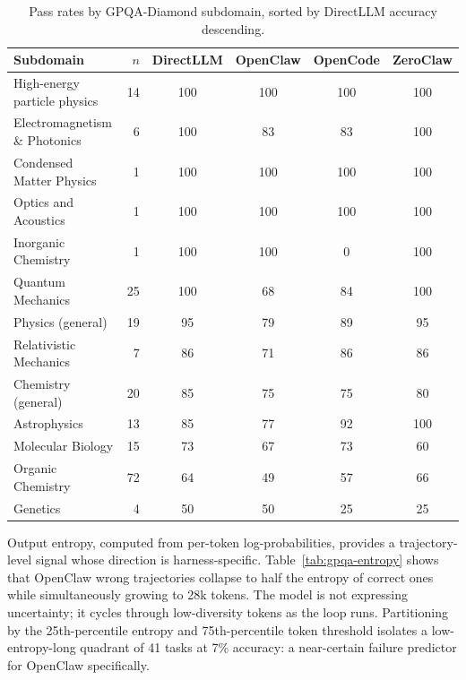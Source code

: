 \begin{table}[t]
\centering
\small
\caption{%
  Pass rates by GPQA-Diamond subdomain, sorted by DirectLLM accuracy descending.
}
\label{tab:gpqa-subdomain}
\setlength{\tabcolsep}{4pt}
\begin{tabular}{lrcccc}
\toprule
Subdomain & $n$ & DirectLLM & OpenClaw & OpenCode & ZeroClaw \\
\midrule
High-energy particle physics  & 14 & 100 & 100 & 100 & 100 \\
Electromagnetism \& Photonics &  6 & 100 &  83 &  83 & 100 \\
Condensed Matter Physics      &  1 & 100 & 100 & 100 & 100 \\
Optics and Acoustics          &  1 & 100 & 100 & 100 & 100 \\
Inorganic Chemistry           &  1 & 100 & 100 &   0 & 100 \\
Quantum Mechanics             & 25 & 100 &  68 &  84 & 100 \\
Physics (general)             & 19 &  95 &  79 &  89 &  95 \\
Relativistic Mechanics        &  7 &  86 &  71 &  86 &  86 \\
Chemistry (general)           & 20 &  85 &  75 &  75 &  80 \\
Astrophysics                  & 13 &  85 &  77 &  92 & 100 \\
Molecular Biology             & 15 &  73 &  67 &  73 &  60 \\
Organic Chemistry             & 72 &  64 &  49 &  57 &  66 \\
Genetics                      &  4 &  50 &  50 &  25 &  25 \\
\bottomrule
\end{tabular}
\end{table}


Output entropy, computed from per-token log-probabilities, provides a
trajectory-level signal whose direction is harness-specific.
Table~\ref{tab:gpqa-entropy} shows that OpenClaw wrong trajectories collapse to
half the entropy of correct ones while simultaneously growing to 28k tokens.
The model is not expressing uncertainty; it cycles through low-diversity tokens
as the loop runs.
Partitioning by the 25th-percentile entropy and 75th-percentile token threshold
isolates a low-entropy-long quadrant of 41 tasks at 7\% accuracy: a near-certain
failure predictor for OpenClaw specifically.

